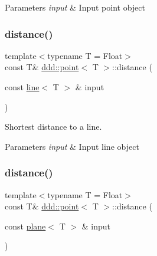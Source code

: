 \begin{DoxyParams}{Parameters}
{\em input} & Input point object \\
\hline
\end{DoxyParams}
\mbox{\label{classddd_1_1point_a8f6afdb0816e235ffd63a9d31a91e65f}} 
\subsubsection{\texorpdfstring{distance()}{distance()}\hspace{0.1cm}{\footnotesize\ttfamily [2/3]}}
{\footnotesize\ttfamily template$<$typename T = Float$>$ \\
const T\& \hyperlink{classddd_1_1point}{ddd\+::point}$<$ T $>$\+::distance (\begin{DoxyParamCaption}\item[{const \hyperlink{classddd_1_1line}{line}$<$ T $>$ \&}]{input }\end{DoxyParamCaption})\hspace{0.3cm}{\ttfamily [inline]}}



Shortest distance to a line. 


\begin{DoxyParams}{Parameters}
{\em input} & Input line object \\
\hline
\end{DoxyParams}
\mbox{\label{classddd_1_1point_a1080466b104b23a1b041f6049aaed15d}} 
\subsubsection{\texorpdfstring{distance()}{distance()}\hspace{0.1cm}{\footnotesize\ttfamily [3/3]}}
{\footnotesize\ttfamily template$<$typename T = Float$>$ \\
const T\& \hyperlink{classddd_1_1point}{ddd\+::point}$<$ T $>$\+::distance (\begin{DoxyParamCaption}\item[{const \hyperlink{classddd_1_1plane}{plane}$<$ T $>$ \&}]{input }\end{DoxyParamCaption})\hspace{0.3cm}{\ttfamily [inline]}}



